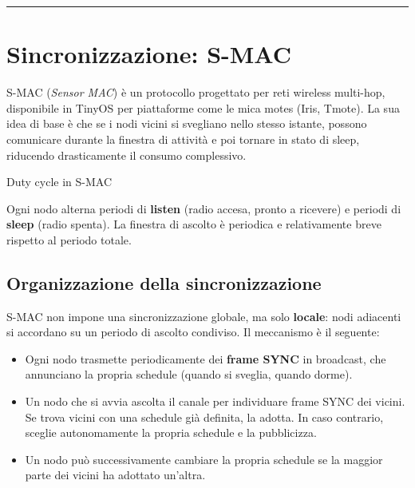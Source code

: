 \documentclass[
  italian,
  openany]{book}
\providecommand{\tightlist}{%
  \setlength{\itemsep}{0pt}\setlength{\parskip}{0pt}}
\begin{document}
\begin{center}\rule{0.5\linewidth}{0.5pt}\end{center}

\section{Sincronizzazione: S-MAC}\label{sincronizzazione-s-mac}

S-MAC (\emph{Sensor MAC}) è un protocollo progettato per reti wireless
multi-hop, disponibile in TinyOS per piattaforme come le mica motes
(Iris, Tmote). La sua idea di base è che se i nodi vicini si svegliano
nello stesso istante, possono comunicare durante la finestra di attività
e poi tornare in stato di sleep, riducendo drasticamente il consumo
complessivo.

\begin{calloutdefinition}{Duty cycle in S-MAC}

Ogni nodo alterna periodi di \textbf{listen} (radio accesa, pronto a
ricevere) e periodi di \textbf{sleep} (radio spenta). La finestra di
ascolto è periodica e relativamente breve rispetto al periodo totale.

\end{calloutdefinition}

\subsection{Organizzazione della
sincronizzazione}\label{organizzazione-della-sincronizzazione}

S-MAC non impone una sincronizzazione globale, ma solo \textbf{locale}:
nodi adiacenti si accordano su un periodo di ascolto condiviso. Il
meccanismo è il seguente:

\begin{itemize}
\tightlist
\item
  Ogni nodo trasmette periodicamente dei \textbf{frame SYNC} in
  broadcast, che annunciano la propria schedule (quando si sveglia,
  quando dorme).
\item
  Un nodo che si avvia ascolta il canale per individuare frame SYNC dei
  vicini. Se trova vicini con una schedule già definita, la adotta. In
  caso contrario, sceglie autonomamente la propria schedule e la
  pubblicizza.
\item
  Un nodo può successivamente cambiare la propria schedule se la maggior
  parte dei vicini ha adottato un'altra.
\end{itemize}
\end{document}
